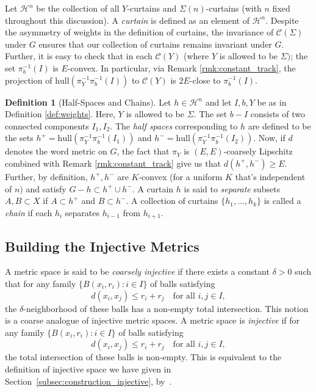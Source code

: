 \documentclass{amsart}
\numberwithin{thm}{section}
\numberwithin{figure}{section}
\theoremstyle{definition}
\theoremstyle{definition}
\newtheorem{defn}[thm]{Definition}
\theoremstyle{remark}
\newcommand{\hull}{\mathrm{hull}}
\numberwithin{equation}{section}
\theoremstyle{plain}
\begin{document}
Let $\mathcal{H}^n$ be the collection of all $Y$-curtains and $\Sigma(n)$-curtains (with $n$ fixed throughout this discussion). A \emph{curtain} is defined as an element of $\mathcal{H}^n$. Despite the asymmetry of weights in the definition of curtains, the invariance of $\mathcal{C}(\Sigma)$ under $G$ ensures that our collection of curtains remains invariant under $G$. Further, it is easy to check that in each $\mathcal{C}(Y)$ (where $Y$ is allowed to be $\Sigma)$; the set $\pi_b^{-1}(I)$ is $E$-convex. In particular, via Remark \ref{rmk:constant_track}, the projection of $\hull(\pi_Y^{-1}\pi_b^{-1}(I))$ to $\mathcal{C}(Y)$ is $2E$-close to $\pi_b^{-1}(I)$.




\begin{defn}[Half-Spaces and Chains] Let $h \in \mathcal{H}^n$ and let $I,b,Y$ be as in Definition \ref{def:weights}. Here, $Y$ is allowed to be $\Sigma.$ The set $b-I$ consists of two connected components $I_1, I_2$. The \emph{half spaces} corresponding to $h$ are defined to be the sets $h^+=\hull(\pi_Y^{-1}\pi_b^{-1}(I_1))$ and $h^-= \hull(\pi_Y^{-1}\pi_b^{-1}(I_2))$. Now, if $d$ denotes the word metric on $G$, the fact that $\pi_Y$ is $(E,E)$-coarsely Lipschitz combined with Remark \ref{rmk:constant_track} give us that $d(h^+,h^-) \geq E$. Further, by definition, $h^+,h^-$ are $K$-convex (for a uniform $K$ that's independent of $n)$ and satisfy $G-h \subset h^+ \cup h^-$. A curtain $h$ is said to \emph{separate} subsets $A,B \subset X$ if $A \subset h^+$ and $B \subset h^-$. A collection of curtains $\{h_1, \dots, h_k\}$ is called a \emph{chain} if each $h_i$ separates $h_{i-1}$ from $h_{i+1}$. 
\end{defn}


\subsection{Building the Injective Metrics} 
\label{subsec:coarsely_injective}
A metric space is said to be \emph{coarsely injective} if there exists a constant $\delta > 0$ such that for any family $\{ B(x_i, r_i) : i \in I \}$ of balls satisfying 
\[
d(x_i, x_j) \leq r_i + r_j \quad \text{for all } i, j \in I,
\]
the $\delta$-neighborhood of these balls has a non-empty total intersection. This notion is a coarse analogue of injective metric spaces. A metric space is \emph{injective} if for any family $\{ B(x_i, r_i) : i \in I \}$ of balls satisfying 
\[
d(x_i, x_j) \leq r_i + r_j \quad \text{for all } i, j \in I,
\]
the total intersection of these balls is non-empty. This is equivalent to the definition of injective space we have given in Section~\ref{subsec:construction_injective}, by~\cite[Proposition~2.3]{Lang13:Injective}.
\end{document}
